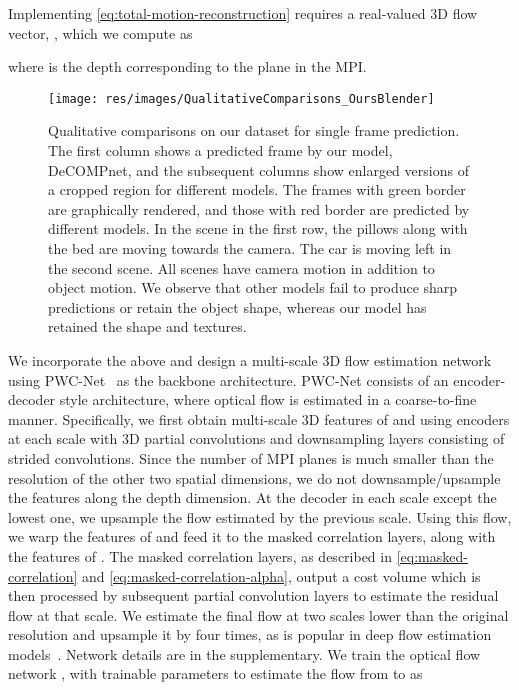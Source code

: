 \documentclass[preprint]{vgtc}
\begin{document}
Implementing \autoref{eq:total-motion-reconstruction} requires a real-valued 3D flow vector, , which we compute as
    
    where  is the depth corresponding to the  plane in the MPI\@.




    \begin{figure*}
        \centering
        \texttt{[image: res/images/QualitativeComparisons\_OursBlender]}
        \caption{Qualitative comparisons on our dataset for single frame prediction.
        The first column shows a predicted frame by our model, DeCOMPnet, and the subsequent columns show enlarged versions of a cropped region for different models.
        The frames with green border are graphically rendered, and those with red border are predicted by different models.
In the scene in the first row, the pillows along with the bed are moving towards the camera.
        The car is moving left in the second scene.
        All scenes have camera motion in addition to object motion.
        We observe that other models fail to produce sharp predictions or retain the object shape, whereas our model has retained the shape and textures.
        }
        \label{fig:qualitative-comparisons-ours}
    \end{figure*}

    We incorporate the above and design a multi-scale 3D flow estimation network using PWC-Net~\cite{sun2018pwcnet} as the backbone architecture.
    PWC-Net consists of an encoder-decoder style architecture, where optical flow is estimated in a coarse-to-fine manner.
    Specifically, we first obtain multi-scale 3D features of  and  using encoders at each scale with 3D partial convolutions and downsampling layers consisting of strided convolutions.
    Since the number of MPI planes is much smaller than the resolution of the other two spatial dimensions, we do not downsample/upsample the features along the depth dimension.
    At the decoder in each scale except the lowest one, we upsample the flow estimated by the previous scale.
    Using this flow, we warp the features of  and feed it to the masked correlation layers, along with the features of .
    The masked correlation layers, as described in \autoref{eq:masked-correlation} and \autoref{eq:masked-correlation-alpha}, output a cost volume which is then processed by subsequent partial convolution layers to estimate the residual flow at that scale.
    We estimate the final flow at two scales lower than the original resolution and upsample it by four times, as is popular in deep flow estimation models~\cite{sun2018pwcnet}.
    Network details are in the supplementary.
    We train the optical flow network , with trainable parameters  to estimate the flow from  to  as
    
\end{document}
